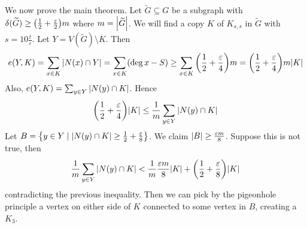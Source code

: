 We now prove the main theorem.
Let \( \widetilde G \subseteq G \) be a subgraph with \( \delta(\widetilde G) \geq \qty(\frac{1}{2} + \frac{\varepsilon}{2})m \) where \( m = \abs{\widetilde G} \).
We will find a copy \( K \) of \( K_{s,s} \) in \( \widetilde G \) with \( s = 10 \frac{t}{\varepsilon} \).
Let \( Y = V(\widetilde G) \setminus K \).
Then
\[ e(Y,K) = \sum_{x \in K} \abs{N(x) \cap Y} = \sum_{x \in K} (\deg x - S) \geq \sum_{x \in K} \qty(\frac{1}{2} + \frac{\varepsilon}{4})m = \qty(\frac{1}{2} + \frac{\varepsilon}{4})m\abs{K} \]
Also, \( e(Y,K) = \sum_{y \in Y} \abs{N(y) \cap K} \).
Hence
\[ \qty(\frac{1}{2} + \frac{\varepsilon}{4}) \abs{K} \leq \frac{1}{m} \sum_{y \in Y} \abs{N(y) \cap K} \]
Let \( B = \qty{y \in Y \mid \abs{N(y) \cap K} \geq \frac{1}{2} + \frac{\varepsilon}{8}} \).
We claim \( \abs{B} \geq \frac{\varepsilon m}{8} \).
Suppose this is not true, then
\[ \frac{1}{m}\sum_{y \in Y} \abs{N(y) \cap K} < \frac{1}{m} \frac{\varepsilon m}{8} \abs{K} + \qty(\frac{1}{2} + \frac{\varepsilon}{8})\abs{K} \]
contradicting the previous inequality.
Then we can pick by the pigeonhole principle a vertex on either side of \( K \) connected to some vertex in \( B \), creating a \( K_3 \).
